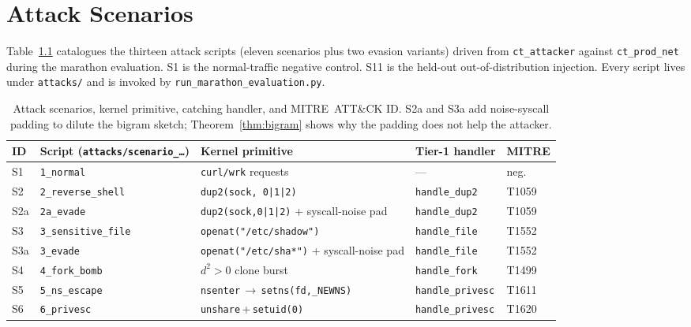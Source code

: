 \chapter{Attack Scenarios}
\label{AppendixA}

Table~\ref{tab:attack-catalogue} catalogues the thirteen attack scripts
(eleven scenarios plus two evasion variants) driven from
\texttt{ct\_attacker} against \texttt{ct\_prod\_net} during the marathon
evaluation. S1 is the normal-traffic negative control. S11 is the
held-out out-of-distribution injection. Every script lives under
\texttt{attacks/} and is invoked by
\texttt{run\_marathon\_evaluation.py}.

\begin{table}[h]
\centering
\caption[Attack catalogue]{Attack scenarios, kernel primitive, catching
handler, and MITRE~ATT\&CK ID. S2a and S3a add noise-syscall padding to
dilute the bigram sketch; Theorem~\ref{thm:bigram} shows why the padding
does not help the attacker.}
\label{tab:attack-catalogue}
\footnotesize
\setlength\tabcolsep{3pt}
\begin{tabular}{@{}l l p{4.8cm} l l@{}}
\toprule
ID & Script (\texttt{attacks/scenario\_\ldots}) & Kernel primitive & Tier-1 handler & MITRE \\
\midrule
S1   & \texttt{1\_normal}           & \texttt{curl/wrk} requests                  & ---                           & neg. \\
S2   & \texttt{2\_reverse\_shell}   & \texttt{dup2(sock, 0|1|2)}                   & \texttt{handle\_dup2}         & T1059 \\
S2a  & \texttt{2a\_evade}           & \texttt{dup2(sock,0|1|2)} + syscall-noise pad & \texttt{handle\_dup2}       & T1059 \\
S3   & \texttt{3\_sensitive\_file}  & \texttt{openat("/etc/shadow")}               & \texttt{handle\_file}         & T1552 \\
S3a  & \texttt{3\_evade}            & \texttt{openat("/etc/sha*")} + syscall-noise pad & \texttt{handle\_file}    & T1552 \\
S4   & \texttt{4\_fork\_bomb}       & $d^2\!>\!0$ clone burst                     & \texttt{handle\_fork}         & T1499 \\
S5   & \texttt{5\_ns\_escape}       & \texttt{nsenter}\,$\to$\,\texttt{setns(fd,\_NEWNS)} & \texttt{handle\_privesc} & T1611 \\
S6   & \texttt{6\_privesc}          & \texttt{unshare}\,+\,\texttt{setuid(0)}              & \texttt{handle\_privesc} & T1620 \\

\end{tabular}
\end{table}
